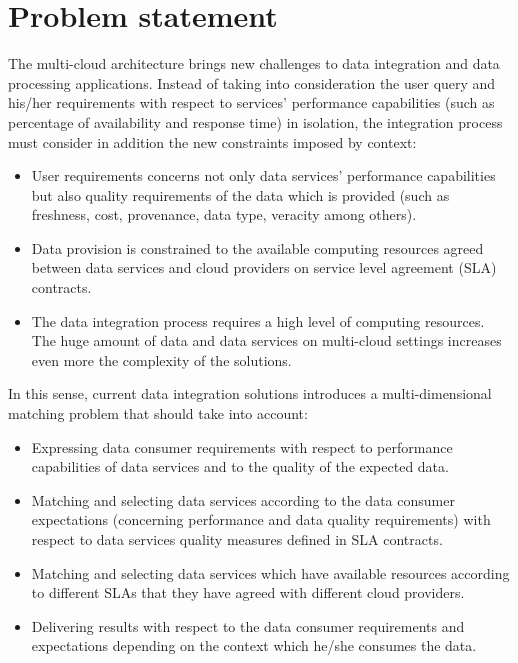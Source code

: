 
\section{Problem statement}\label{problem}
%
The multi-cloud architecture brings new challenges to data integration
and data processing applications.
%
Instead of taking into consideration the user query and his/her requirements
with respect to services' performance capabilities (such as percentage of 
availability and response time) in isolation, the integration process 
must consider in addition the new constraints imposed by context: 
%
\begin{itemize}
\renewcommand{\labelitemi}{$-$}
\item User requirements concerns not only data services' performance 
capabilities but also quality requirements of the data which is provided
(such as freshness, cost, provenance, data type, veracity among others).
%
\item Data provision is constrained to the available computing resources agreed
between data services and cloud providers on service level agreement (SLA) contracts. 
%
\item The data integration process requires a high level of computing resources.
The huge amount of data and data services on multi-cloud settings increases even 
more the complexity of the solutions.
\end{itemize}
%
In this sense, current data integration solutions introduces a multi-dimensional 
matching problem that should take into account:
%
\begin{itemize}
\renewcommand{\labelitemi}{$-$}
\item Expressing data consumer requirements with respect to performance 
capabilities of data services and to the quality of the expected data.
%
\item Matching and selecting data services according to the data consumer expectations 
(concerning performance and data quality requirements) with respect to data 
services quality measures defined in SLA contracts. 
%
\item Matching and selecting data services which have available resources according
to different SLAs that they have agreed with different cloud providers.
%
\item Delivering results with respect to the data consumer requirements and expectations 
depending on the context which he/she consumes the data.
\end{itemize}
